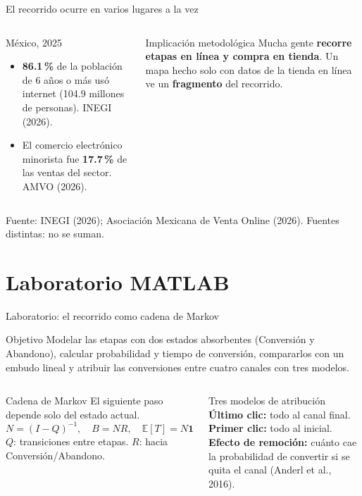 \documentclass[aspectratio=169,xcolor=dvipsnames]{beamer}
\newcommand{\fuente}[1]{{\tiny\color{IPNgris}Fuente: #1}}
\begin{document}
\begin{frame}{El recorrido ocurre en varios lugares a la vez}
\begin{columns}[T]
  \begin{block}{México, 2025}
    \small
    \begin{itemize}
      \item \textbf{86.1\,\%} de la población de 6 años o más usó internet (104.9 millones de personas). INEGI (2026).
      \item El comercio electrónico minorista fue \textbf{17.7\,\%} de las ventas del sector. AMVO (2026).
    \end{itemize}
  \end{block}
  \begin{alertblock}{Implicación metodológica}
    \small Mucha gente \textbf{recorre etapas en línea y compra en tienda}. Un mapa hecho solo con datos de la tienda en línea ve un \textbf{fragmento} del recorrido.
  \end{alertblock}
\end{columns}
\fuente{INEGI (2026); Asociación Mexicana de Venta Online (2026). Fuentes distintas: no se suman.}
\end{frame}

\section[Laboratorio]{Laboratorio MATLAB}

\begin{frame}{Laboratorio: el recorrido como cadena de Markov}
\begin{block}{Objetivo}
  Modelar las etapas con dos estados absorbentes (Conversión y Abandono), calcular probabilidad y tiempo de conversión, compararlos con un embudo lineal y atribuir las conversiones entre cuatro canales con tres modelos.
\end{block}
\begin{columns}[T]
  \begin{exampleblock}{Cadena de Markov}
    \scriptsize
    El siguiente paso depende solo del estado actual.
    \[ N=(I-Q)^{-1},\quad B=NR,\quad \mathbb{E}[T]=N\mathbf{1} \]
    $Q$: transiciones entre etapas. $R$: hacia Conversión/Abandono.
  \end{exampleblock}
  \begin{block}{Tres modelos de atribución}
    \scriptsize
    \textbf{Último clic:} todo al canal final. \textbf{Primer clic:} todo al inicial. \textbf{Efecto de remoción:} cuánto cae la probabilidad de convertir si se quita el canal (Anderl et al., 2016).
  \end{block}
\end{columns}
\end{frame}
\end{document}
